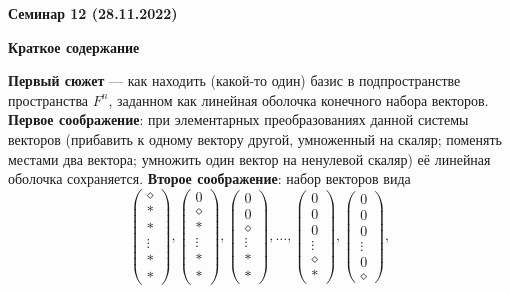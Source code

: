 \documentclass[10pt, a4paper]{extarticle}
\theoremstyle{definition}
\begin{document}
\begin{center}
\small
\noindent{}
\end{center}

\large

\begin{center}
\textbf{Семинар 12 (28.11.2022)}
\end{center}

\textbf{Краткое содержание}

\textbf{Первый сюжет} --- как находить (какой-то один) базис в подпространстве пространства $F^n$, заданном как линейная оболочка 
конечного набора векторов. \textbf{Первое соображение}: при элементарных преобразованиях данной системы векторов (прибавить к 
одному вектору другой, умноженный на скаляр; поменять местами два вектора; умножить один вектор на ненулевой скаляр) её
линейная оболочка сохраняется. \textbf{Второе соображение}: набор векторов вида
\[
\begin{pmatrix}
\diamond \\ * \\ * \\ \vdots \\ * \\ *
\end{pmatrix},
\begin{pmatrix}
0 \\ \diamond \\ * \\ \vdots \\ * \\ *
\end{pmatrix},
\begin{pmatrix}
0 \\ 0 \\ \diamond \\ \vdots \\ * \\ *
\end{pmatrix},
\dots,
\begin{pmatrix}
0 \\ 0 \\ 0 \\ \vdots \\ \diamond \\ *
\end{pmatrix},
\begin{pmatrix}
0 \\ 0 \\ 0 \\ \vdots \\ 0 \\ \diamond
\end{pmatrix},
\]
\end{document}
